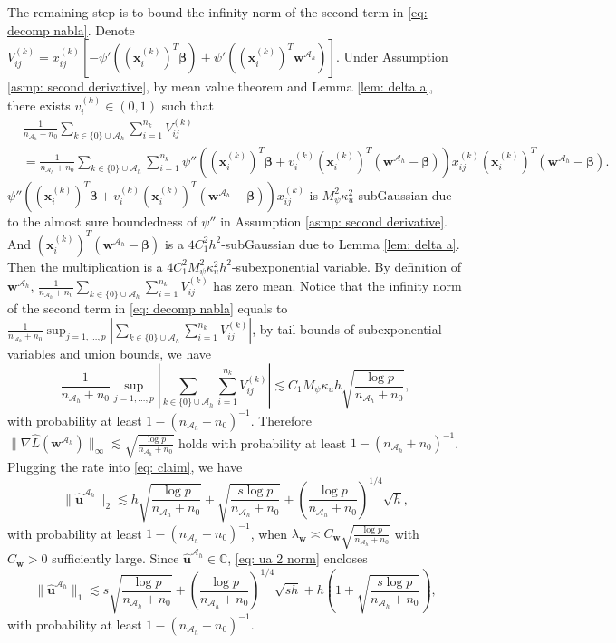 \documentclass[12pt]{article}
\newcommand{\infnorm}[1]{\|#1\|_{\infty}}
\newcommand{\twonorm}[1]{\|#1\|_{2}}
\newcommand{\onenorm}[1]{\|#1\|_{1}}
\newcommand{\norma}[1]{\left|#1\right|}
\newcommand{\norm}[1]{|#1|}
\newcommand{\bbeta}{\bm{\beta}}
\newcommand{\bxk}[1]{\bm{x}^{(#1)}}
\newcommand{\huah}{\hat{\bm{u}}^{\mathcal{A}_h}}
\newcommand{\bw}{\bm{w}}
\newcommand{\bwah}{\bm{w}^{\mathcal{A}_h}}
\newcommand{\mah}{\mathcal{A}_h}
\newcommand{\nah}{n_{\mathcal{A}_h}}
\newcommand{\transet}{\{0\}\cup \mah}
\newcommand{\<}{\langle}
\renewcommand{\>}{\rangle}
\begin{document}
	The remaining step is to bound the infinity norm of the second term in \eqref{eq: decomp nabla}. Denote $V_{ij}^{(k)} = x_{ij}^{(k)}[-\psi'((\bxk{k}_i)^T\bbeta) + \psi'((\bxk{k}_i)^T\bwah)]$. 
	Under Assumption \ref{asmp: second derivative}, by mean value theorem and Lemma \ref{lem: delta a}, there exists $v_{i}^{(k)} \in (0, 1)$ such that
			\begin{align}
				&\frac{1}{\nah+n_0}\sum_{k\in \transet}\sum_{i=1}^{n_k}V_{ij}^{(k)}\\
				&= \frac{1}{\nah+n_0}\sum_{k\in \transet}\sum_{i=1}^{n_k} \psi''((\bxk{k}_i)^T\bbeta+v_{i}^{(k)}(\bxk{k}_i)^T(\bwah-\bbeta))x_{ij}^{(k)}(\bxk{k}_i)^T(\bwah-\bbeta).
			\end{align}
			$\psi''((\bxk{k}_i)^T\bbeta+v_{i}^{(k)}(\bxk{k}_i)^T(\bwah-\bbeta))x_{ij}^{(k)}$ is $M_{\psi}^2\kappa_u^2$-subGaussian due to the almost sure boundedness of $\psi''$ in Assumption \ref{asmp: second derivative}. And $(\bxk{k}_i)^T(\bwah-\bbeta)$ is a $4C_1^2h^2$-subGaussian due to Lemma \ref{lem: delta a}. Then the multiplication is a $4C_1^2M_{\psi}^2\kappa_u^2h^2$-subexponential variable. By definition of $\bwah$, $\frac{1}{\nah+n_0}\sum_{k\in \transet}\sum_{i=1}^{n_k}V_{ij}^{(k)}$ has zero mean. Notice that the infinity norm of the second term in \eqref{eq: decomp nabla} equals to $\frac{1}{\nah+n_0}\sup_{j = 1,\ldots,p}\norm{\sum_{k\in \transet}\sum_{i=1}^{n_k}V_{ij}^{(k)}}$, by tail bounds of subexponential variables and union bounds, we have
			\begin{equation}
				\frac{1}{\nah+n_0}\sup_{j = 1,\ldots,p}\norma{\sum_{k\in \transet}\sum_{i=1}^{n_k}V_{ij}^{(k)}} \lesssim C_1M_{\psi}\kappa_u h \sqrt{\frac{\log p}{\nah+n_0}},
			\end{equation}
			with probability at least $1-(\nah + n_0)^{-1}$. Therefore $\infnorm{\nabla \hat{L}(\bwah)} \lesssim \sqrt{\frac{\log p}{\nah + n_0}}$ holds with probability at least $1-(\nah + n_0)^{-1}$. Plugging the rate into \eqref{eq: claim}, we have
	\begin{equation}
		\twonorm{\huah} \lesssim h\sqrt{\frac{\log p}{\nah + n_0}} + \sqrt{\frac{s\log p}{\nah + n_0}}  + \left(\frac{\log p}{\nah+n_0}\right)^{1/4}\sqrt{h}, \label{eq: ua 2 norm}
	\end{equation}
	with probability at least $1-(\nah + n_0)^{-1}$, when $\lambda_{\bw} \asymp C_{\bw}\sqrt{\frac{\log p}{\nah + n_0}}$ with $C_{\bw} > 0$ sufficiently large. Since $\huah \in \mathds{C}$, \eqref{eq: ua 2 norm} encloses
	\begin{equation}
		\onenorm{\huah} \lesssim s\sqrt{\frac{\log p}{\nah + n_0}}  + \left(\frac{\log p}{\nah+n_0}\right)^{1/4}\sqrt{sh} + h\left(1+\sqrt{\frac{s\log p}{\nah + n_0}}\right), \label{eq: ua 1 norm}
	\end{equation}
	with probability at least $1-(\nah + n_0)^{-1}$.
	
\end{document}
